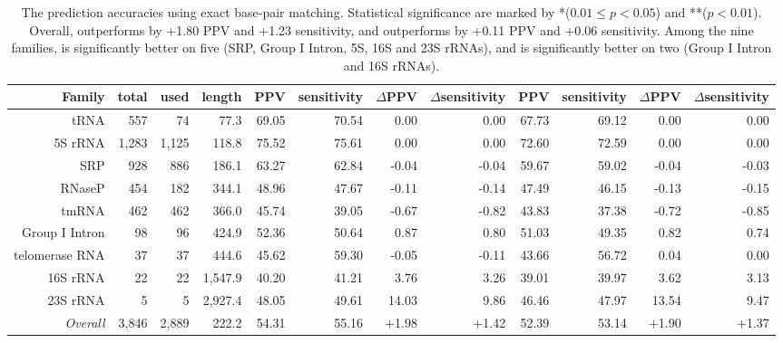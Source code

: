 \begin{table*}[h]
\begin{tabular}{r|rrr||rr|rr||rr|rr}
    Family & total & used & length & PPV & sensitivity & $\Delta$PPV & $\Delta$sensitivity & PPV & sensitivity & $\Delta$PPV & $\Delta$sensitivity \\
    \hline
    tRNA & 557 & 74 & 77.3 &  69.05 & 70.54 & 0.00  & 0.00  & 67.73 & 69.12 & 0.00  & 0.00  \\
    5S rRNA & 1,283 & 1,125 & 118.8 &  75.52  & 75.61 & 0.00  & 0.00  & 72.60 & 72.59 & 0.00  & 0.00  \\
    SRP  & 928 & 886 & 186.1 & 63.27  & 62.84 & -0.04 & -0.04 & 59.67 & 59.02 & -0.04 & -0.03 \\  
    RNaseP & 454 & 182 & 344.1 &  48.96 & 47.67 & -0.11 & -0.14 & 47.49 & 46.15 & -0.13 & -0.15 \\  
    tmRNA  & 462 & 462 & 366.0 &  45.74 & 39.05 & -0.67 & -0.82 & 43.83 & 37.38 & -0.72 & -0.85 \\  
    Group I Intron & 98 & 96 & 424.9 & 52.36  & 50.64 & 0.87  & 0.80  & 51.03 & 49.35 & 0.82  & 0.74  \\  
    telomerase RNA & 37 & 37 & 444.6 & 45.62  & 59.30 & -0.05 & -0.11 & 43.66 & 56.72 & 0.04  & 0.00  \\  
    16S rRNA & 22 & 22 & 1,547.9 &  40.20 & 41.21 & 3.76  & 3.26  & 39.01 & 39.97 & 3.62  & 3.13  \\  
    23S rRNA & 5 & 5 & 2,927.4 & 48.05  & 49.61 & 14.03 & 9.86  & 46.46 & 47.97 & 13.54 & 9.47  \\  
    \hline
    {\em Overall} & 3,846 & 2,889 & 222.2 & 54.31 & 55.16 & +1.98  & +1.42  & 52.39 & 53.14 & +1.90  & +1.37  \\  
  \end{tabular}
  \smallskip
  \caption{The prediction accuracies using exact base-pair matching. Statistical significance are marked by 
    *($0.01\leq p<0.05$) and **($p<0.01$).
    Overall, \linearfoldc outperforms \contrafoldmfe by +1.80 PPV and +1.23 sensitivity, %
    and \linearfoldv outperforms \viennarnafold by +0.11 PPV and +0.06 sensitivity. %
    Among the nine families, \linearfoldc is significantly better on five (SRP, Group I Intron, 5S, 16S and 23S rRNAs), %
    and \linearfoldv is significantly better on two (Group I Intron and 16S rRNAs).  %
    \label{tab:accuracy_nos}}
\end{table*}

\newpage

